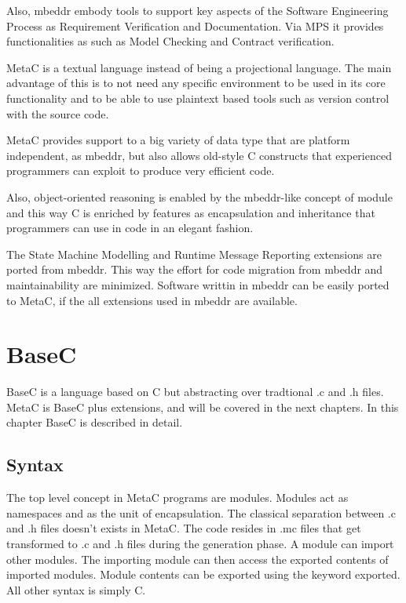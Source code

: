 \documentclass[a4paper,10pt,titlepage]{report}
\begin{document}
Also, mbeddr embody tools to support key aspects of the Software Engineering Process as Requirement Verification and Documentation. Via MPS it provides functionalities as such as Model Checking and Contract verification.

MetaC is a textual language instead of being a projectional language. The main advantage of this is to not need any specific environment to be used in its core functionality and to be able to use plaintext based tools such as version control with the source code. 

MetaC provides support to a big variety of data type that are platform independent, as mbeddr, but also allows old-style C constructs that experienced programmers can exploit to produce very efficient code.

Also, object-oriented reasoning is enabled by the mbeddr-like concept of module and this way C is enriched by features as encapsulation and inheritance that programmers can use in code in an elegant fashion.

The State Machine Modelling and Runtime Message Reporting extensions are ported from mbeddr. This way the effort for code migration from mbeddr and maintainability are minimized. Software writtin in mbeddr can be easily ported to MetaC, if the all extensions used in mbeddr are available.


\chapter{BaseC}

BaseC is a language based on C but abstracting over tradtional .c and .h files. 
MetaC is BaseC plus extensions, and will be covered in the next chapters. In this chapter BaseC is described in detail. 

\section{Syntax}

The top level concept in MetaC programs are modules. Modules act as namespaces and as the unit of encapsulation. The classical separation between .c and .h files doesn’t exists in MetaC. The code resides in .mc files that get transformed to .c and .h files during the generation phase. 
A module can import other modules. The importing module can then access the exported contents of imported modules. Module contents can be exported using the keyword exported. All other syntax is simply C.
\end{document}
